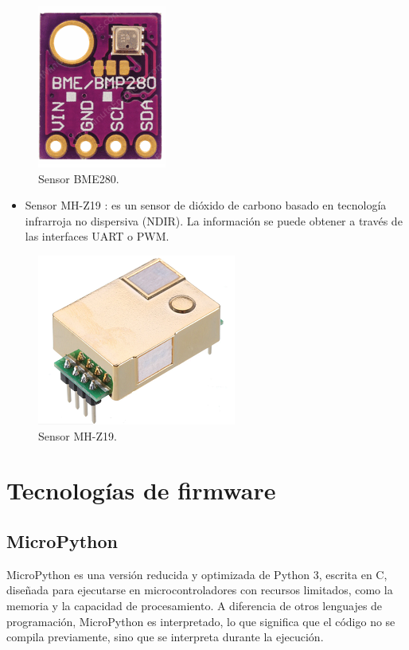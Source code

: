 \begin{figure}[H]
    \centering
    \includegraphics[width=.2\textwidth]{./Figures/sensor_bme280.png}
    \caption{Sensor BME280.}
    \label{fig:bme280}
\end{figure}

\begin{itemize}
	\item Sensor MH-Z19 \citep{sensor_mhz19}: es un sensor de dióxido de carbono basado en tecnología infrarroja no dispersiva (NDIR). La información se puede obtener a través de las interfaces UART o PWM.
\end{itemize}

\begin{figure}[H]
    \centering
    \includegraphics[width=.3\textwidth]{./Figures/sensor_mhz19.png}
    \caption{Sensor MH-Z19.}
    \label{fig:mhz19}
\end{figure}


\section{Tecnologías de firmware}

\subsection{MicroPython}

MicroPython es una versión reducida y optimizada de Python 3, escrita en C, diseñada para ejecutarse en microcontroladores con recursos limitados, como la memoria y  la capacidad de procesamiento. A diferencia de otros lenguajes de programación, MicroPython es interpretado, lo que significa que el código no se compila previamente, sino que se interpreta durante la ejecución.

